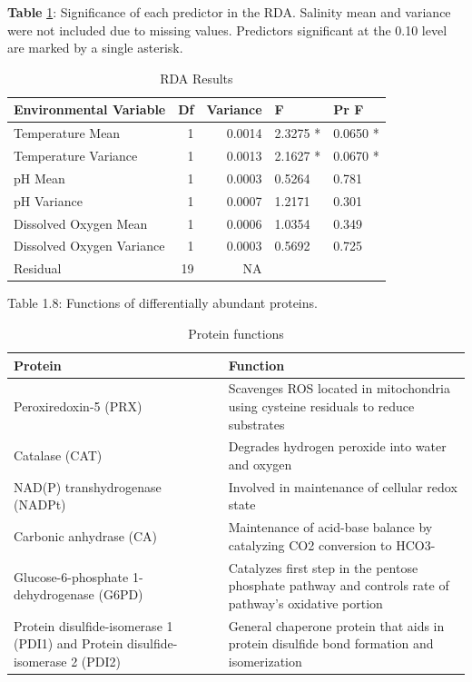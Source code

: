\documentclass [11pt, proquest] {uwthesis}[2015/03/03]
\begin{document}
\textbf{Table} \ref{tab:RDA}: Significance of each predictor in the RDA. Salinity mean and variance were not included due to missing values. Predictors significant at the 0.10 level are marked by a single asterisk.

\begingroup\fontsize{10}{12}\selectfont
\begin{longtable}[t]{lrrll}
\caption{\label{tab:RDA}RDA Results}\\
\toprule
Environmental Variable & Df & Variance & F & Pr  F \\
\midrule
Temperature Mean & 1 & 0.0014 & 2.3275 * & 0.0650 *\\
Temperature Variance & 1 & 0.0013 & 2.1627 * & 0.0670 *\\
pH Mean & 1 & 0.0003 & 0.5264 & 0.781\\
pH Variance & 1 & 0.0007 & 1.2171 & 0.301\\
Dissolved Oxygen Mean & 1 & 0.0006 & 1.0354 & 0.349\\
\addlinespace
Dissolved Oxygen Variance & 1 & 0.0003 & 0.5692 & 0.725\\
Residual & 19 & NA &  & \\
\bottomrule
\end{longtable}
\endgroup{}
\clearpage
\begin{landscape}

Table 1.8: Functions of differentially abundant proteins.

\begingroup\fontsize{8}{10}\selectfont
\begin{longtable}[t]{ll}
\caption{\label{tab:protfunctions}Protein functions}\\
\toprule
Protein & Function\\
\midrule
Peroxiredoxin-5 (PRX) & Scavenges ROS located in mitochondria using cysteine residuals to reduce substrates\\
Catalase (CAT) & Degrades hydrogen peroxide into water and oxygen\\
NAD(P) transhydrogenase (NADPt) & Involved in maintenance of cellular redox state\\
Carbonic anhydrase (CA) & Maintenance of acid-base balance by catalyzing CO2 conversion to HCO3- \\
Glucose-6-phosphate 1-dehydrogenase (G6PD) & Catalyzes first step in the pentose phosphate pathway and controls rate of pathway’s oxidative portion\\
\addlinespace
Protein disulfide-isomerase 1 (PDI1) and Protein disulfide-isomerase 2 (PDI2) & General chaperone protein that aids in protein disulfide bond formation and isomerization\\
\bottomrule
\end{longtable}
\endgroup{}
\end{landscape}
\clearpage
\end{document}
